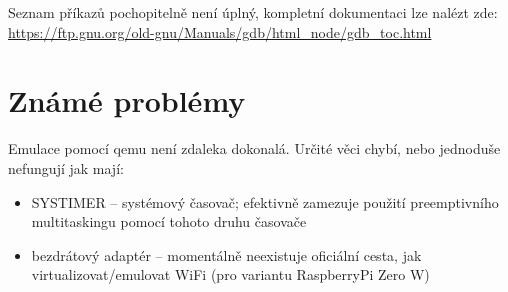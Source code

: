 \documentclass{article}
\begin{document}
Seznam příkazů pochopitelně není úplný, kompletní dokumentaci lze nalézt zde: \url{https://ftp.gnu.org/old-gnu/Manuals/gdb/html_node/gdb_toc.html}


\section{Známé problémy}

Emulace pomocí qemu není zdaleka dokonalá. Určité věci chybí, nebo jednoduše nefungují jak mají:

\begin{itemize}
	\item SYSTIMER -- systémový časovač; efektivně zamezuje použití preemptivního multitaskingu pomocí tohoto druhu časovače
	\item bezdrátový adaptér -- momentálně neexistuje oficiální cesta, jak virtualizovat/emulovat WiFi (pro variantu RaspberryPi Zero W)
\end{itemize}
\end{document}
